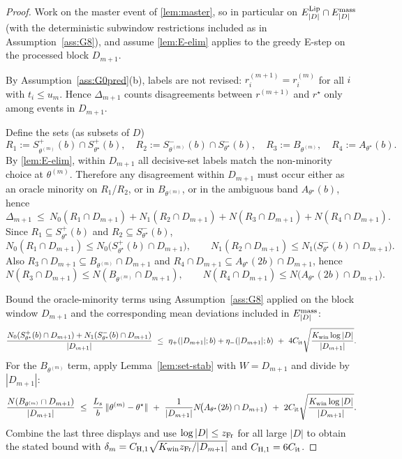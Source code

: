 \documentclass{statsoc}
\newcommand{\1}{\mathbbm{1}}
\begin{document}
\begin{proof}
Work on the master event of \cref{lem:master}, so in particular on
$E^{\rm Lip}_{|D|}\cap E^{\rm mass}_{|D|}$ (with the deterministic subwindow restrictions included as in
Assumption~\ref{ass:G8}), and assume \cref{lem:E-elim} applies to the greedy E-step on the processed block $D_{m+1}$.

By Assumption~\ref{ass:G0pred}(b), labels are not revised: $r^{(m+1)}_i=r^{(m)}_i$ for all $i$ with $t_i\le u_m$.
Hence $\Delta_{m+1}$ counts disagreements between $r^{(m+1)}$ and $r^\star$ only among events in $D_{m+1}$.

Define the sets (as subsets of $D$)
\[
R_1:=S_{\theta^{(m)}}^+(b)\cap S_{\theta^\star}^+(b),\quad
R_2:=S_{\theta^{(m)}}^-(b)\cap S_{\theta^\star}^-(b),\quad
R_3:=B_{\theta^{(m)}},\quad
R_4:=A_{\theta^\star}(b).
\]
By \cref{lem:E-elim}, within $D_{m+1}$ all decisive-set labels match the non-minority choice at $\theta^{(m)}$.
Therefore any disagreement within $D_{m+1}$ must occur either as an oracle minority on $R_1$/$R_2$,
or in $B_{\theta^{(m)}}$, or in the ambiguous band $A_{\theta^\star}(b)$, hence
\[
\Delta_{m+1}
\ \le\ N_0(R_1\cap D_{m+1})+N_1(R_2\cap D_{m+1})+N(R_3\cap D_{m+1})+N(R_4\cap D_{m+1}).
\]
Since $R_1\subseteq S_{\theta^\star}^+(b)$ and $R_2\subseteq S_{\theta^\star}^-(b)$,
\[
N_0(R_1\cap D_{m+1})\le N_0\!\big(S_{\theta^\star}^+(b)\cap D_{m+1}\big),\qquad
N_1(R_2\cap D_{m+1})\le N_1\!\big(S_{\theta^\star}^-(b)\cap D_{m+1}\big).
\]
Also $R_3\cap D_{m+1}\subseteq B_{\theta^{(m)}}\cap D_{m+1}$ and
$R_4\cap D_{m+1}\subseteq A_{\theta^\star}(2b)\cap D_{m+1}$, hence
\[
N(R_3\cap D_{m+1})\le N(B_{\theta^{(m)}}\cap D_{m+1}),\qquad
N(R_4\cap D_{m+1})\le N\!\big(A_{\theta^\star}(2b)\cap D_{m+1}\big).
\]

Bound the oracle-minority terms using Assumption~\ref{ass:G8} applied on the block window $D_{m+1}$ and the corresponding
mean deviations included in $E^{\rm mass}_{|D|}$:
\[
\frac{N_0(S_{\theta^\star}^+(b)\cap D_{m+1})+N_1(S_{\theta^\star}^-(b)\cap D_{m+1})}{|D_{m+1}|}
\ \le\ \eta_+(|D_{m+1}|;b)+\eta_-(|D_{m+1}|;b)\ +\ 4C_{\rm it}\sqrt{\frac{K_{\rm win}\log|D|}{|D_{m+1}|}}.
\]
For the $B_{\theta^{(m)}}$ term, apply Lemma~\ref{lem:set-stab} with $W=D_{m+1}$ and divide by $|D_{m+1}|$:
\[
\frac{N(B_{\theta^{(m)}}\cap D_{m+1})}{|D_{m+1}|}
\ \le\ \frac{L_s}{b}\,\|\theta^{(m)}-\theta^\star\|
\ +\ \frac{1}{|D_{m+1}|}N\!\big(A_{\theta^\star}(2b)\cap D_{m+1}\big)
\ +\ 2C_{\rm it}\sqrt{\frac{K_{\rm win}\log|D|}{|D_{m+1}|}}.
\]
Combine the last three displays and use $\log|D|\le z_{\rm Fr}$ for all large $|D|$ to obtain the stated bound
with $\delta_m=C_{\rm H,1}\sqrt{K_{\rm win}z_{\rm Fr}/|D_{m+1}|}$ and $C_{\rm H,1}=6C_{\rm it}$.
\end{proof}
\end{document}
